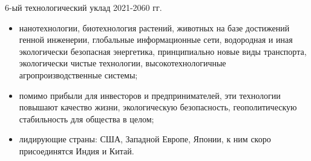 \documentclass[_Venture_p1.tex]{subfiles}
\begin{document}
\begin{frame}[allowframebreaks]{6-ый технологический уклад 2021-2060 гг.}
\begin{itemize}
	\small
	\item нанотехнологии, биотехнология растений, животных на базе достижений генной инженерии, глобальные информационные сети, водородная и иная экологически безопасная энергетика, принципиально новые виды транспорта, экологически чистые технологии, высокотехнологичные агропроизводственные системы; 
	
	\pagebreak
	\item помимо прибыли для инвесторов и предпринимателей, эти технологии повышают качество жизни, экологическую безопасность, геополитическую стабильность для общества в целом;
	\item лидирующие страны: США, Западной Европе, Японии, к ним скоро присоединятся Индия и Китай.
\end{itemize}
\end{frame}
\end{document}
